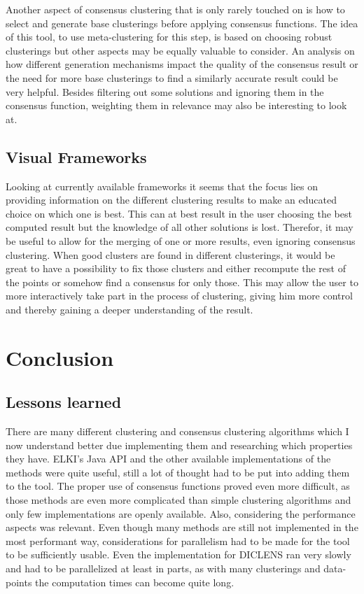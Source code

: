 \documentclass[
	a4paper,
	english,
	twoside,
	openright,               
	11pt                            
	]{report}
\begin{document}
Another aspect of consensus clustering that is only rarely touched on is how to select and generate base clusterings before applying consensus functions. The idea of this tool, to use meta-clustering for this step, is based on choosing robust clusterings but other aspects may be equally valuable to consider. An analysis on how different generation mechanisms impact the quality of the consensus result or the need for more base clusterings to find a similarly accurate result could be very helpful. Besides filtering out some solutions and ignoring them in the consensus function, weighting them in relevance may also be interesting to look at.

\section{Visual Frameworks}
Looking at currently available frameworks it seems that the focus lies on providing information on the different clustering results to make an educated choice on which one is best. This can at best result in the user choosing the best computed result but the knowledge of all other solutions is lost. Therefor, it may be useful to allow for the merging of one or more results, even ignoring consensus clustering. When good clusters are found in different clusterings, it would be great to have a possibility to fix those clusters and either recompute the rest of the points or somehow find a consensus for only those. This may allow the user to more interactively take part in the process of clustering, giving him more control and thereby gaining a deeper understanding of the result.

\chapter{Conclusion}\label{cha:conclusion}

\section{Lessons learned}
There are many different clustering and consensus clustering algorithms which I now understand better due implementing them and researching which properties they have. ELKI's \cite{10.14778/2824032.2824115} Java API and the other available implementations of the methods were quite useful, still a lot of thought had to be put into adding them to the tool. The proper use of consensus functions proved even more difficult, as those methods are even more complicated than simple clustering algorithms and only few implementations are openly available. Also, considering the performance aspects was relevant. Even though many methods are still not implemented in the most performant way, considerations for parallelism had to be made for the tool to be sufficiently usable. Even the implementation for DICLENS \cite{6035671} ran very slowly and had to be parallelized at least in parts, as with many clusterings and data-points the computation times can become quite long.
\end{document}
